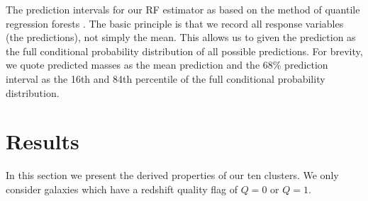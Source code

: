 
The prediction intervals for our RF estimator as based on the method of quantile regression forests \citep{Meinshausen2006}. The basic principle is that we record all response variables (the predictions), not simply the mean. This allows us to given the prediction as the full conditional probability distribution of all possible predictions. For brevity, we quote predicted masses as the mean prediction and the 68\% prediction interval as the 16th and 84th percentile of the full conditional probability distribution.

\section{Results}\label{sec:results}
In this section we present the derived properties of our ten clusters. We only consider galaxies which have a redshift quality flag of $Q=0$ or $Q=1$.
 
